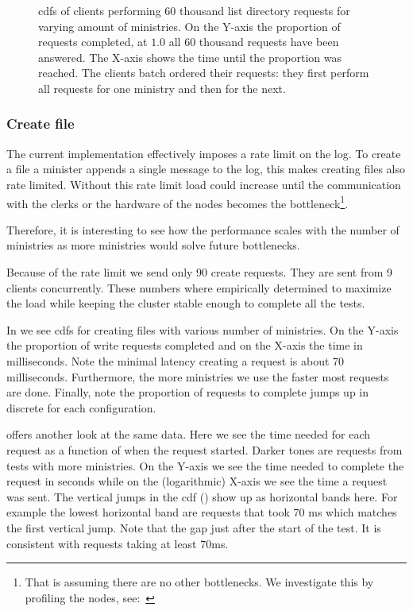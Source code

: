 \begin{figure}[htbp]
	\centering
	
	\caption{\acp{cdf} of clients performing 60 thousand list directory requests for varying amount of ministries. On the Y-axis the proportion of requests completed, at $1.0$ all 60 thousand requests have been answered. The X-axis shows the time until the proportion was reached. The clients batch ordered their requests: they first perform all requests for one ministry and then for the next.}
	\label{fig:ls_cdf}
\end{figure}

\clearpage{}
\subsubsection{Create file}
The current implementation effectively imposes a rate limit on the log. To create a file a minister appends a single message to the log, this makes creating files also rate limited. Without this rate limit load could increase until the communication with the clerks or the hardware of the nodes becomes the bottleneck\footnote{That is assuming there are no other bottlenecks. We investigate this by profiling the nodes, see:~}. 

Therefore, it is interesting to see how the performance scales with the number of ministries as more ministries would  solve future bottlenecks.

Because of the rate limit we send only 90 create requests. They are sent from 9 clients concurrently. These numbers where empirically determined to maximize the load while keeping the cluster stable enough to complete all the tests.

In  we see \acp{cdf} for creating files with various number of ministries. On the Y-axis the proportion of write requests completed and on the X-axis the time in milliseconds. Note the minimal latency creating a request is about 70 milliseconds. Furthermore, the more ministries we use the faster most requests are done. Finally, note the proportion of requests to complete jumps up in discrete for each configuration.

 offers another look at the same data. Here we see the time needed for each request as a function of when the request started. Darker tones are requests from tests with more ministries. On the Y-axis we see the time needed to complete the request in seconds while on the (logarithmic) X-axis we see the time a request was sent. The vertical jumps in the \ac{cdf} () show up as horizontal bands here. For example the lowest horizontal band are requests that took 70 ms which matches the first vertical jump. Note that the gap just after the start of the test. It is consistent with requests taking at least 70ms.

